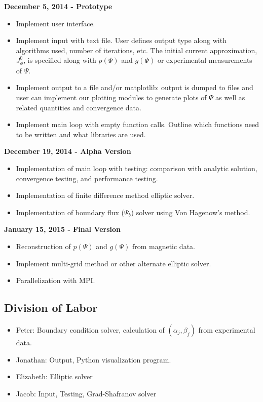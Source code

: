 \documentclass[paper=letter, fontsize=11pt]{scrartcl} %
\begin{document}
\textbf{December 5, 2014 - Prototype}
\begin{itemize}
\item Implement user interface. 
\item Implement input with text file. User defines output type along with algorithms used, number of iterations, etc.  The initial current approximation, $J^0_{\phi}$, is specified along with $p(\Psi)$ and $g(\Psi)$ or experimental measurements of $\Psi$. 
\item Implement output to a file and/or matplotlib: output is dumped to files and user can implement our plotting modules to generate plots of $\Psi$ as well as related quantities and convergence data. 
\item Implement main loop with empty function calls. Outline which functions need to be written and what libraries are used. 
\end{itemize}

\textbf{December 19, 2014 - Alpha Version}
\begin{itemize}
\item Implementation of main loop with testing: comparison with analytic solution, convergence testing, and performance testing. 
\item Implementation of finite difference method elliptic solver.
\item Implementation of boundary flux ($\Psi_b$) solver using Von Hagenow's method. 
\end{itemize}

\textbf{January 15, 2015 - Final Version}
\begin{itemize}
\item Reconstruction of $p(\Psi)$ and $g(\Psi)$ from magnetic data. 
\item Implement multi-grid method or other alternate elliptic solver. 
\item Parallelization with MPI.
\end{itemize}

\subsection{Division of Labor}
\begin{itemize}
\item Peter: Boundary condition solver, calculation of $(\alpha_j,\beta_j)$ from experimental data.
\item Jonathan: Output, Python visualization program.
\item Elizabeth: Elliptic solver
\item Jacob: Input, Testing, Grad-Shafranov solver
\end{itemize}
\end{document}
